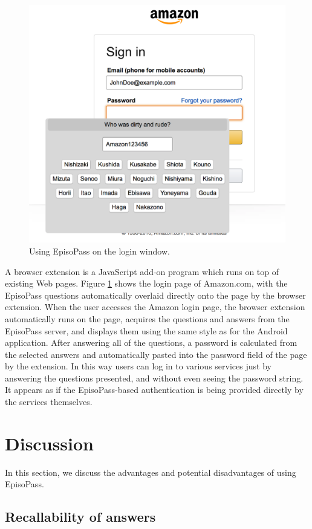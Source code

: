 \documentclass[runningheads,a4paper]{llncs}
\begin{document}
\begin{figure}
\centering
\includegraphics[width=0.8\columnwidth]{figures/aeff16ffcab956e554364e9e5aca8359}
\caption{Using EpisoPass on the login window.}
\label{extension}
\end{figure}

A browser extension is a JavaScript add-on program which runs
on top of existing Web pages.
%
Figure \ref{extension} shows the login page of Amazon.com, with the 
EpisoPass questions automatically overlaid directly onto the page
by the browser extension.
%
When the user accesses the Amazon login page,
the browser extension automatically runs on the page,
acquires the questions and answers from the EpisoPass server,
and displays them using the same style as for the Android application.
%
After answering all of the questions, a password is calculated from the
selected answers and automatically pasted into the password field of the page
by the extension. In this way users can log in to various services just by
answering the questions presented, and without even seeing the password string.
It appears as if the EpisoPass-based authentication is being provided directly
by the services themselves.

\section{Discussion}

In this section, we discuss the advantages and potential disadvantages of using EpisoPass.

\subsection{Recallability of answers}
\end{document}
